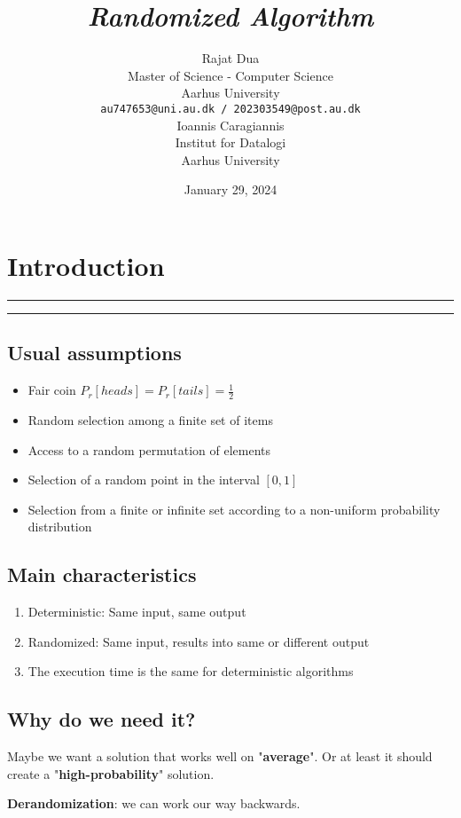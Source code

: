 \documentclass{article}
\title{\emph{Randomized Algorithm}}
\author{{\hspace{1mm}Rajat Dua} \\
	Master of Science - Computer Science\\
	Aarhus University\\
	\texttt{au747653@uni.au.dk / 202303549@post.au.dk} \\
	\And
	{\hspace{1mm}Ioannis Caragiannis} \\
	Institut for Datalogi\\
	Aarhus University\\
}
\date{January 29, 2024}
\begin{document}
\maketitle
\vspace{-1cm}
\section{Introduction}
\hrule
\hrule

\vspace{1cm}

\subsection{Usual assumptions}

\begin{itemize}
    \item Fair coin $P_r[heads] = P_r[tails] = \frac{1}{2}$
    \item Random selection among a finite set of items
    \item Access to a random permutation of elements
    \item Selection of a random point in the interval $[0,1]$
    \item Selection from a finite or infinite set according to a non-uniform probability distribution
\end{itemize}

\subsection{Main characteristics}

\begin{enumerate}
    \item Deterministic: Same input, same output
    \item Randomized: Same input, results into same or different output
    \item The execution time is the same for deterministic algorithms
\end{enumerate}

\subsection{Why do we need it?}
Maybe we want a solution that works well on "\textbf{average}". Or at least it should create a "\textbf{high-probability}" solution.

\textbf{Derandomization}: we can work our way backwards.
\end{document}
